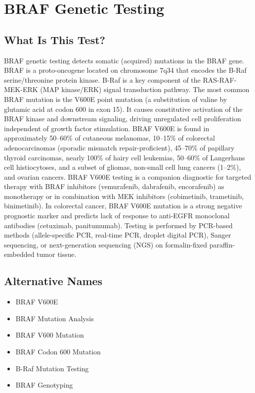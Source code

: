\chapter{BRAF Genetic Testing}

\section*{What Is This Test?}
BRAF genetic testing detects somatic (acquired) mutations in the BRAF gene. BRAF is a proto-oncogene located on chromosome 7q34 that encodes the B-Raf serine/threonine protein kinase. B-Raf is a key component of the RAS-RAF-MEK-ERK (MAP kinase/ERK) signal transduction pathway. The most common BRAF mutation is the V600E point mutation (a substitution of valine by glutamic acid at codon 600 in exon 15). It causes constitutive activation of the BRAF kinase and downstream signaling, driving unregulated cell proliferation independent of growth factor stimulation. BRAF V600E is found in approximately 50--60\% of cutaneous melanomas, 10--15\% of colorectal adenocarcinomas (sporadic mismatch repair-proficient), 45--70\% of papillary thyroid carcinomas, nearly 100\% of hairy cell leukemias, 50--60\% of Langerhans cell histiocytoses, and a subset of gliomas, non-small cell lung cancers (1--2\%), and ovarian cancers. BRAF V600E testing is a companion diagnostic for targeted therapy with BRAF inhibitors (vemurafenib, dabrafenib, encorafenib) as monotherapy or in combination with MEK inhibitors (cobimetinib, trametinib, binimetinib). In colorectal cancer, BRAF V600E mutation is a strong negative prognostic marker and predicts lack of response to anti-EGFR monoclonal antibodies (cetuximab, panitumumab). Testing is performed by PCR-based methods (allele-specific PCR, real-time PCR, droplet digital PCR), Sanger sequencing, or next-generation sequencing (NGS) on formalin-fixed paraffin-embedded tumor tissue.

\section*{Alternative Names}
\begin{itemize}
  \item BRAF V600E
  \item BRAF Mutation Analysis
  \item BRAF V600 Mutation
  \item BRAF Codon 600 Mutation
  \item B-Raf Mutation Testing
  \item BRAF Genotyping
\end{itemize}
